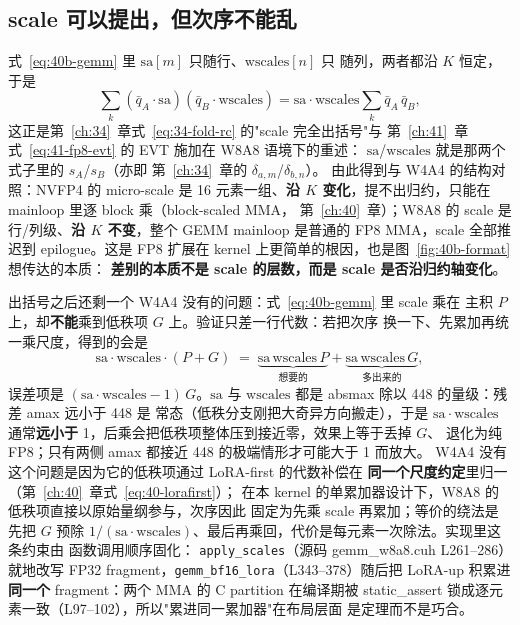 \subsection{scale 可以提出，但次序不能乱}

式~\eqref{eq:40b-gemm} 里 $\mathrm{sa}[m]$ 只随行、$\mathrm{wscales}[n]$ 只
随列，两者都沿 $K$ 恒定，于是
\begin{equation}
  \sum_k (\bar q_A\cdot\mathrm{sa})(\bar q_B\cdot\mathrm{wscales})
    = \mathrm{sa}\cdot\mathrm{wscales}\sum_k \bar q_A\,\bar q_B,
  \label{eq:40b-fold}
\end{equation}
这正是第~\ref{ch:34}~章式~\ref{eq:34-fold-rc} 的"scale 完全出括号"与
第~\ref{ch:41}~章式~\ref{eq:41-fp8-evt} 的 EVT 施加在 W8A8 语境下的重述：
$\mathrm{sa}$/$\mathrm{wscales}$ 就是那两个式子里的 $s_A$/$s_B$（亦即
第~\ref{ch:34}~章的 $\delta_{a,m}$/$\delta_{b,n}$）。
由此得到与 W4A4 的结构对照：NVFP4 的 micro-scale 是 16 元素一组、\textbf{沿
$K$ 变化}，提不出归约，只能在 mainloop 里逐 block 乘（block-scaled MMA，
第~\ref{ch:40}~章）；W8A8 的 scale 是行/列级、\textbf{沿 $K$ 不变}，整个
GEMM mainloop 是普通的 FP8 MMA，scale 全部推迟到 epilogue。这是 FP8 扩展在
kernel 上更简单的根因，也是图~\ref{fig:40b-format} 想传达的本质：
\textbf{差别的本质不是 scale 的层数，而是 scale 是否沿归约轴变化}。

出括号之后还剩一个 W4A4 没有的问题：式~\eqref{eq:40b-gemm} 里 scale 乘在
主积 $P$ 上，却\textbf{不能}乘到低秩项 $G$ 上。验证只差一行代数：若把次序
换一下、先累加再统一乘尺度，得到的会是
\begin{equation}
  \mathrm{sa}\cdot\mathrm{wscales}\cdot(P+G)
    \;=\; \underbrace{\mathrm{sa}\,\mathrm{wscales}\,P}_{\text{想要的}}
      + \underbrace{\mathrm{sa}\,\mathrm{wscales}\,G}_{\text{多出来的}},
  \label{eq:40b-leak}
\end{equation}
误差项是 $(\mathrm{sa}\cdot\mathrm{wscales}-1)\,G$。$\mathrm{sa}$ 与
$\mathrm{wscales}$ 都是 absmax 除以 448 的量级：残差 amax 远小于 448 是
常态（低秩分支刚把大奇异方向搬走），于是 $\mathrm{sa}\cdot\mathrm{wscales}$
通常\textbf{远小于} 1，后乘会把低秩项整体压到接近零，效果上等于丢掉 $G$、
退化为纯 FP8；只有两侧 amax 都接近 448 的极端情形才可能大于 1 而放大。
W4A4 没有这个问题是因为它的低秩项通过 LoRA-first 的代数补偿在
\textbf{同一个尺度约定}里归一（第~\ref{ch:40}~章式~\ref{eq:40-lorafirst}）；
在本 kernel 的单累加器设计下，W8A8 的低秩项直接以原始量纲参与，次序因此
固定为先乘 scale 再累加；等价的绕法是先把 $G$ 预除 $1/(\mathrm{sa}\cdot
\mathrm{wscales})$、最后再乘回，代价是每元素一次除法。实现里这条约束由
函数调用顺序固化：
\texttt{apply\_scales}（源码 gemm\_w8a8.cuh L261--286）就地改写 FP32
fragment，\texttt{gemm\_bf16\_lora}（L343--378）随后把 LoRA-up 积累进
\textbf{同一个} fragment：两个 MMA 的 C partition 在编译期被
static\_assert 锁成逐元素一致（L97--102），所以"累进同一累加器"在布局层面
是定理而不是巧合。


